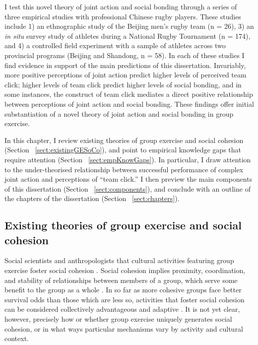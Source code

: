 \begin{CJK}{UTF8}{gbsn}
I test this novel theory of joint action and social bonding through a series of three empirical studies with professional Chinese rugby players. These studies include 1) an ethnographic study of the Beijing men's rugby team (n = 26), 3) an \textit{in situ} survey study of athletes during a National Rugby Tournament (n = 174), and 4) a controlled field experiment with a sample of athletes across two provincial programs (Beijing and Shandong, n = 58). In each of these studies I find evidence in support of the main predictions of this dissertation.  Invariably, more positive perceptions of joint action predict higher levels of perceived team click; higher levels of team click predict higher levels of social bonding, and in some instances, the construct of team click mediates a direct positive relationship between perceptions of joint action and social bonding.  These findings offer initial substantiation of a novel theory of joint action and social bonding in group exercise.

In this chapter, I review existing theories of group exercise and social cohesion (Section ~\ref{sect:existingGESoCo}), and point to empirical knowledge gaps that require attention (Section ~\ref{sect:empKnowGaps}). In particular, I draw attention to the under-theorised relationship between successful performance of complex joint action and perceptions of ``team click.''  I then preview the main components of this dissertation (Section ~\ref{sect:components}), and conclude with an outline of the chapters of the dissertation (Section ~\ref{sect:chapters}).

\subsection{Existing theories of group exercise and social cohesion\label{sect:existingGESoCo}}
Social scientists and anthropologists \citep[see, for example][]{Durkheim1965} that cultural activities featuring group exercise foster social cohesion \citep{Dunbar2010,Whitehouse2004}.  Social cohesion implies proximity, coordination, and stability of relationships between members of a group, which serve some benefit to the group as a whole \citep{Taylor2018}.  In so far as more cohesive groups face better survival odds than those which are less so, activities that foster social cohesion can be considered collectively advantageous and adaptive \citep{Dunbar2010}.  It is not yet clear, however, precisely how or whether group exercise uniquely generates social cohesion, or in what ways particular mechanisms vary by activity and cultural context.


\end{CJK}
